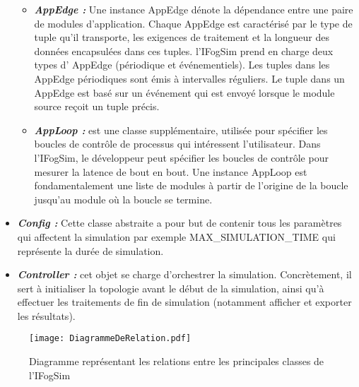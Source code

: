 \begin{itemize}
    \begin{itemize}
        \item \textbf{\emph{AppEdge :}} Une instance AppEdge dénote la dépendance entre une paire de modules d'application. Chaque AppEdge est caractérisé par le type de tuple qu'il transporte, les exigences de traitement et la longueur des données encapsulées dans ces tuples. l'IFogSim prend en charge deux types d' AppEdge (périodique et événementiels). Les tuples dans les AppEdge périodiques sont émis à intervalles réguliers. Le tuple dans un AppEdge est basé sur un événement qui est envoyé lorsque le module source reçoit un tuple précis.
        \item \textbf{\emph{AppLoop :}} est une classe supplémentaire, utilisée pour spécifier les boucles de contrôle de processus qui intéressent l'utilisateur. Dans l'IFogSim, le développeur peut spécifier les boucles de contrôle pour mesurer la latence de bout en bout. Une instance AppLoop est fondamentalement une liste de modules à partir de l'origine de la boucle jusqu'au module où la boucle se termine.
    \end{itemize}
    \item \textbf{\emph{Config :}} Cette classe abstraite a pour but de contenir tous les paramètres qui affectent la simulation par exemple MAX\_SIMULATION\_TIME qui représente la durée de simulation.
    \item \textbf{\emph{Controller :}} cet objet se charge d'orchestrer la simulation. Concrètement, il sert à initialiser la topologie avant le début de la simulation, ainsi qu'à effectuer les traitements de fin de simulation (notamment afficher et exporter les résultats).
\end{itemize}
\begin{figure}[H]
    \centering
    \texttt{[image: DiagrammeDeRelation.pdf]}
    \caption{Diagramme représentant les relations entre les principales classes de l'IFogSim}
\end{figure}

